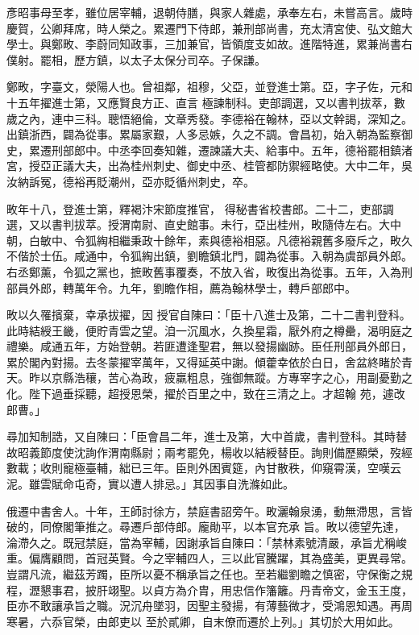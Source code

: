 \begin{pinyinscope}
 彥昭事母至孝，雖位居宰輔，退朝侍膳，與家人雜處，承奉左右，未嘗高言。歲時慶賀，公卿拜席，時人榮之。累遷門下侍郎，兼刑部尚書，充太清宮使、弘文館大學士。與鄭畋、李蔚同知政事，三加兼官，皆領度支如故。進階特進，累兼尚書右僕射。罷相，歷方鎮，以太子太保分司卒。子保謙。



 鄭畋，字臺文，滎陽人也。曾祖鄰，祖穆，父亞，並登進士第。亞，字子佐，元和十五年擢進士第，又應賢良方正、直言
 極諫制科。吏部調選，又以書判拔萃，數歲之內，連中三科。聰悟絕倫，文章秀發。李德裕在翰林，亞以文幹謁，深知之。出鎮浙西，闢為從事。累屬家艱，人多忌嫉，久之不調。會昌初，始入朝為監察御史，累遷刑部郎中。中丞李回奏知雜，遷諫議大夫、給事中。五年，德裕罷相鎮渚宮，授亞正議大夫，出為桂州刺史、御史中丞、桂管都防禦經略使。大中二年，吳汝納訴冤，德裕再貶潮州，亞亦貶循州刺史，卒。



 畋年十八，登進士第，釋褐汴宋節度推官，
 得秘書省校書郎。二十二，吏部調選，又以書判拔萃。授渭南尉、直史館事。未行，亞出桂州，畋隨侍左右。大中朝，白敏中、令狐綯相繼秉政十餘年，素與德裕相惡。凡德裕親舊多廢斥之，畋久不偕於士伍。咸通中，令狐綯出鎮，劉瞻鎮北門，闢為從事。入朝為虞部員外郎。右丞鄭薰，令狐之黨也，摭畋舊事覆奏，不放入省，畋復出為從事。五年，入為刑部員外郎，轉萬年令。九年，劉瞻作相，薦為翰林學士，轉戶部郎中。



 畋以久罹擯棄，幸承拔擢，因
 授官自陳曰：「臣十八進士及第，二十二書判登科。此時結綬王畿，便貯青雲之望。洎一沉風水，久換星霜，厭外府之樽罍，渴明庭之禮樂。咸通五年，方始登朝。若匪遭逢聖君，無以發揚幽跡。臣任刑部員外郎日，累於閣內對揚。去冬蒙擢宰萬年，又得延英中謝。傾藿幸依於白日，舍盆終睹於青天。昨以京縣浩穰，苦心為政，疲羸粗息，強御無蹤。方專宰字之心，用副憂勤之化。陛下過垂採聽，超授恩榮，擢於百里之中，致在三清之上。才超翰
 苑，遽改郎曹。」



 尋加知制誥，又自陳曰：「臣會昌二年，進士及第，大中首歲，書判登科。其時替故昭義節度使沈詢作渭南縣尉；兩考罷免，楊收以結綬替臣。詢則備歷顯榮，歿經數載；收則寵極臺輔，絀已三年。臣則外困賓筵，內甘散秩，仰窺霄漢，空嘆云泥。雖雲賦命屯奇，實以遭人排忌。」其因事自洗滌如此。



 俄遷中書舍人。十年，王師討徐方，禁庭書詔旁午。畋灑翰泉湧，動無滯思，言皆破的，同僚閣筆推之。尋遷戶部侍郎。龐勛平，以本官充承
 旨。畋以德望先達，淪滯久之。既冠禁庭，當為宰輔，因謝承旨自陳曰：「禁林素號清嚴，承旨尤稱峻重。偏膺顧問，首冠英賢。今之宰輔四人，三以此官騰躍，其為盛美，更異尋常。豈謂凡流，繼茲芳躅，臣所以憂不稱承旨之任也。至若繼劉瞻之慎密，守保衡之規程，瀝懇事君，披肝翊聖。以貞方為介胄，用忠信作籓籬。丹青帝文，金玉王度，臣亦不敢讓承旨之職。況沉舟墜羽，因聖主發揚，有薄藝微才，受鴻恩知遇。再周寒暑，六忝官榮，由郎吏以
 至於貳卿，自末僚而遷於上列。」其切於大用如此。




\end{pinyinscope}
